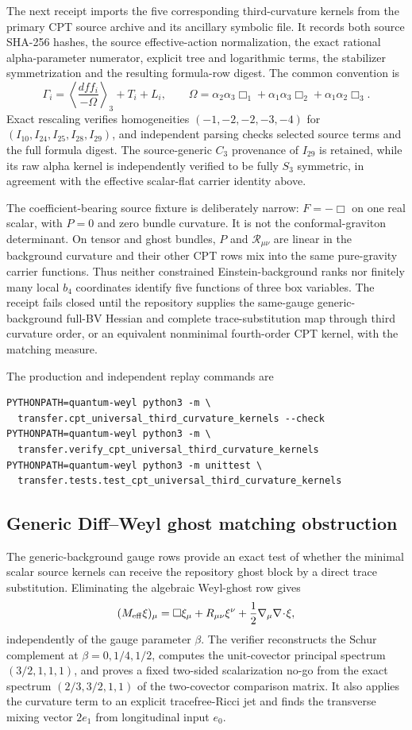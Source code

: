 \documentclass[11pt]{article}
\theoremstyle{definition}
\theoremstyle{remark}
\begin{document}
The next receipt imports the five corresponding third-curvature kernels from
the primary CPT source archive and its ancillary symbolic file.  It records
both source SHA-256 hashes, the source effective-action normalization, the
exact rational alpha-parameter numerator, explicit tree and logarithmic
terms, the stabilizer symmetrization and the resulting formula-row digest.
The common convention is
\[
 \Gamma_i=\left\langle\frac{dff_i}{-\Omega}\right\rangle_3+T_i+L_i,
 \qquad
 \Omega=\alpha_2\alpha_3\Box_1+
 \alpha_1\alpha_3\Box_2+
 \alpha_1\alpha_2\Box_3.
\]
Exact rescaling verifies homogeneities
\((-1,-2,-2,-3,-4)\) for
\((I_{10},I_{24},I_{25},I_{28},I_{29})\), and independent parsing checks
selected source terms and the full formula digest.
The source-generic $C_3$ provenance of $I_{29}$ is retained, while its raw
alpha kernel is independently verified to be fully $S_3$ symmetric, in
agreement with the effective scalar-flat carrier identity above.

The coefficient-bearing source fixture is deliberately narrow:
\(F=-\Box\) on one real scalar, with \(P=0\) and zero bundle curvature.
It is not the conformal-graviton determinant.  On tensor and ghost bundles,
\(P\) and \(\mathcal R_{\mu\nu}\) are linear in the background curvature
and their other CPT rows mix into the same pure-gravity carrier functions.
Thus neither constrained Einstein-background ranks nor finitely many local
\(b_4\) coordinates identify five functions of three box variables.  The
receipt fails closed until the repository supplies the same-gauge
generic-background full-BV Hessian and complete trace-substitution map through
third curvature order, or an equivalent nonminimal fourth-order CPT kernel,
with the matching measure.

The production and independent replay commands are
\begin{verbatim}
PYTHONPATH=quantum-weyl python3 -m \
  transfer.cpt_universal_third_curvature_kernels --check
PYTHONPATH=quantum-weyl python3 -m \
  transfer.verify_cpt_universal_third_curvature_kernels
PYTHONPATH=quantum-weyl python3 -m unittest \
  transfer.tests.test_cpt_universal_third_curvature_kernels
\end{verbatim}

\subsection{Generic Diff--Weyl ghost matching obstruction}

The generic-background gauge rows provide an exact test of whether the
minimal scalar source kernels can receive the repository ghost block by a
direct trace substitution.  Eliminating the algebraic Weyl-ghost row gives
\[
 (M_{\rm eff}\xi)_\mu=\Box\xi_\mu+R_{\mu\nu}\xi^\nu
 +\frac12\nabla_\mu\nabla\!\cdot\!\xi,
\]
independently of the gauge parameter $\beta$.  The verifier reconstructs the
Schur complement at $\beta=0,1/4,1/2$, computes the unit-covector principal
spectrum $(3/2,1,1,1)$, and proves a fixed two-sided scalarization no-go from
the exact spectrum $(2/3,3/2,1,1)$ of the two-covector comparison matrix.
It also applies the curvature term to an explicit tracefree-Ricci jet and
finds the transverse mixing vector $2e_1$ from longitudinal input $e_0$.
\end{document}
